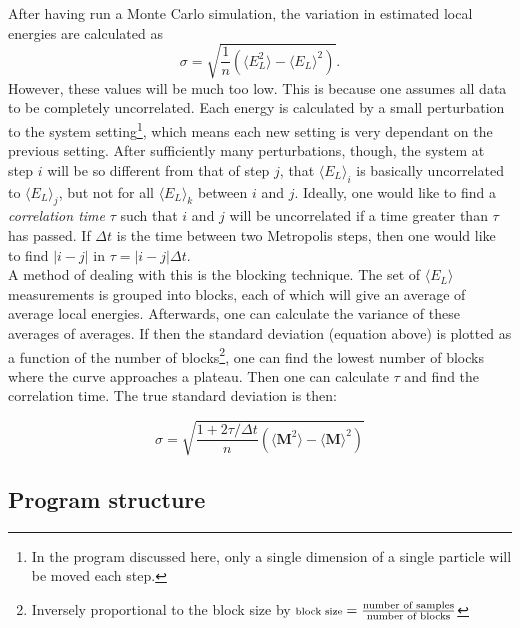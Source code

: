 \documentclass[english, a4paper]{article}
\newcommand\lr[1]{\left(#1\right)}
\begin{document}
After having run a Monte Carlo simulation, the variation in estimated local energies are calculated as
\begin{equation}
	\sigma = \sqrt{\frac{1}{n}\lr{\langle E_L^2 \rangle - \langle E_L \rangle^2}}. \label{uncorelatedVariance}
\end{equation} 
However, these values will be much too low.
This is because one assumes all data to be completely uncorrelated. Each energy is calculated by a small perturbation to the system setting\footnote{In the program discussed here, only a single dimension of a single particle will be moved each step.}, which means each new setting is very dependant on the previous setting. After sufficiently many perturbations, though, the system at step $i$ will be so different from that of step $j$, that $\langle E_L\rangle_i$ is basically uncorrelated to  $\langle E_L\rangle_j$, but not for all $\langle E_L\rangle_k$ between $i$ and $j$. Ideally, one would like to find a \emph{correlation time} $\tau$ such that $i$ and $j$ will be uncorrelated if a time greater than $\tau$ has passed. If $\Delta t$ is the time between two Metropolis steps, then one would like to find $|i-j|$ in $\tau = |i-j|\Delta t$.\\
A method of dealing with this is the blocking technique. The set of $\langle E_L\rangle$ measurements is grouped into blocks, each of which will give an average of average local energies. Afterwards, one can calculate the variance of these averages of averages. If then the standard deviation (equation above) is plotted as a function of the number of blocks\footnote{Inversely proportional to the block size by $\text{\scriptsize block size} = \frac{\text{number of samples}}{\text{number of blocks}}$}, one can find the lowest number of blocks where the curve approaches a plateau. Then one can calculate $\tau$ and find the correlation time. The true standard deviation is then:

\begin{equation}
	\sigma=\sqrt{\frac{1+2\tau/\Delta t}{n}\left(\langle \mathbf{M}^2\rangle-\langle \mathbf{M}\rangle^2\right)}
\end{equation}


\subsection{Program structure}
\end{document}
